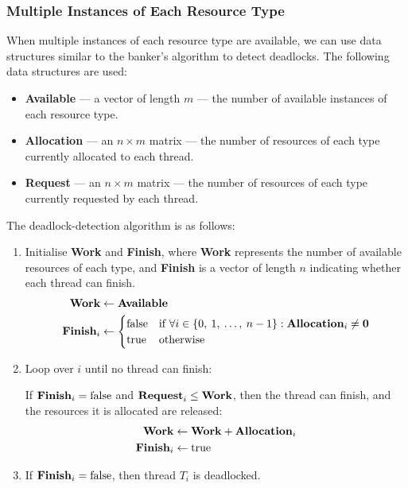 \documentclass{article}
\begin{document}
\subsubsection{Multiple Instances of Each Resource Type}
When multiple instances of each resource type are available, we can use
data structures similar to the banker's algorithm to detect deadlocks.
The following data structures are used:
\begin{itemize}
    \item \textbf{Available} --- a vector of length \(m\) --- the number of available instances of each resource type.
    \item \textbf{Allocation} --- an \(n \times m\) matrix --- the
          number of resources of each type currently allocated to each
          thread.
    \item \textbf{Request} --- an \(n \times m\) matrix --- the
          number of resources of each type currently requested by each
          thread.
\end{itemize}
The deadlock-detection algorithm is as follows:
\begin{enumerate}
    \item Initialise \textbf{Work} and \textbf{Finish}, where
          \textbf{Work} represents the number of available resources of
          each type, and \textbf{Finish} is a vector of length \(n\)
          indicating whether each thread can finish.
          \begin{align*}
              \text{\textbf{Work}}     & \gets \text{\textbf{Available}} \\
              \text{\textbf{Finish}}_i & \gets
              \begin{cases}
                  \text{false} & \text{if } \forall i \in \left\{ 0,\: 1,\: \ldots,\: n-1 \right\} : \text{\textbf{Allocation}}_i \neq \textbf{0} \\
                  \text{true}  & \text{otherwise}
              \end{cases}
          \end{align*}
    \item Loop over \(i\) until no thread can finish:

          If \(\text{\textbf{Finish}}_i = \text{false}\) and
          \(\text{\textbf{Request}}_i \leq \text{\textbf{Work}}\), then
          the thread can finish, and the resources it is allocated are
          released:
          \begin{align*}
              \text{\textbf{Work}}     & \gets \text{\textbf{Work}} + \text{\textbf{Allocation}}_i \\
              \text{\textbf{Finish}}_i & \gets \text{true}
          \end{align*}
    \item If \(\text{\textbf{Finish}}_i = \text{false}\), then thread
          \(T_i\) is deadlocked.
\end{enumerate}
\end{document}
